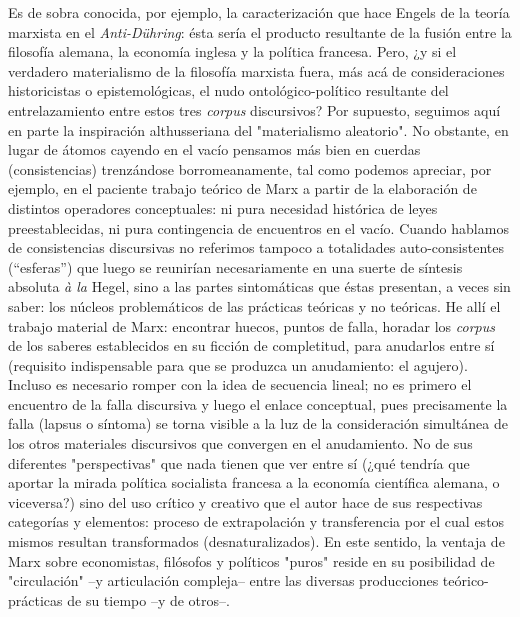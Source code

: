 Es de sobra conocida, por ejemplo, la caracterización que hace Engels de
la teoría marxista en el \emph{Anti-Dühring}: ésta sería el producto
resultante de la fusión entre la filosofía alemana, la economía inglesa
y la política francesa. Pero, ¿y si el verdadero materialismo de la
filosofía marxista fuera, más acá de consideraciones historicistas o
epistemológicas, el nudo ontológico-político resultante del
entrelazamiento entre estos tres \emph{corpus} discursivos? Por
supuesto, seguimos aquí en parte la inspiración althusseriana del
"materialismo aleatorio". No obstante, en lugar de átomos cayendo en el
vacío pensamos más bien en cuerdas (consistencias) trenzándose
borromeanamente, tal como podemos apreciar, por ejemplo, en el paciente
trabajo teórico de Marx a partir de la elaboración de distintos
operadores conceptuales: ni pura necesidad histórica de leyes
preestablecidas, ni pura contingencia de encuentros en el vacío. Cuando
hablamos de consistencias discursivas no referimos tampoco a totalidades
auto-consistentes (``esferas'') que luego se reunirían necesariamente en
una suerte de síntesis absoluta \emph{à la} Hegel, sino a las partes
sintomáticas que éstas presentan, a veces sin saber: los núcleos
problemáticos de las prácticas teóricas y no teóricas. He allí el
trabajo material de Marx: encontrar huecos, puntos de falla, horadar los
\emph{corpus} de los saberes establecidos en su ficción de completitud,
para anudarlos entre sí (requisito indispensable para que se produzca un
anudamiento: el agujero). Incluso es necesario romper con la idea de
secuencia lineal; no es primero el encuentro de la falla discursiva y
luego el enlace conceptual, pues precisamente la falla (lapsus o
síntoma) se torna visible a la luz de la consideración simultánea de los
otros materiales discursivos que convergen en el anudamiento. No de sus
diferentes "perspectivas" que nada tienen que ver entre sí (¿qué tendría
que aportar la mirada política socialista francesa a la economía
científica alemana, o viceversa?) sino del uso crítico y creativo que el
autor hace de sus respectivas categorías y elementos: proceso de
extrapolación y transferencia por el cual estos mismos resultan
transformados (desnaturalizados). En este sentido, la ventaja de Marx
sobre economistas, filósofos y políticos "puros" reside en su
posibilidad de "circulación" --y articulación compleja-- entre las
diversas producciones teórico-prácticas de su tiempo --y de otros--.

